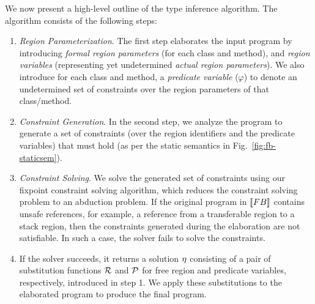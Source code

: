 We now present a high-level outline of the type inference algorithm.
The algorithm consists of the following steps:
\begin{enumerate}
 \item \emph{Region Parameterization}.
   The first step elaborates the input program by introducing \emph{formal region parameters}
   (for each class and method), and \emph{region variables} (representing yet undetermined
   \emph{actual region parameters}). We also introduce for each class and method, a
   \emph{predicate variable} ($\varphi$) to denote an undetermined set of constraints
   over the region parameters of that class/method.

 \item \emph{Constraint Generation}.
   In the second step, we analyze the program to generate a set of constraints
   (over the region identifiers and the predicate variables)
   that must hold (as per the static semantics in Fig.~\ref{fig:fb-staticsem}).

 \item \emph{Constraint Solving}.
   We solve the generated set of constraints using our fixpoint constraint
   solving algorithm, which reduces the constraint solving problem to
   an abduction problem. If the original program in $\llbracket {\sc FB} \rrbracket$ contains unsafe
   references, for example, a reference from a transferable region to a
   stack region, then the constraints generated during the elaboration
   are not satisfiable. In such a case, the solver fails to solve
   the constraints.

 \item If the solver succeeds, it returns a solution $\eta$ consisting of a
   pair of substitution functions $\mathcal{R}$ and $\mathcal{P}$ for
   free region and predicate variables, respectively, introduced in step 1.
   We apply these substitutions to the elaborated program to produce the final program.
\end{enumerate}

% 

